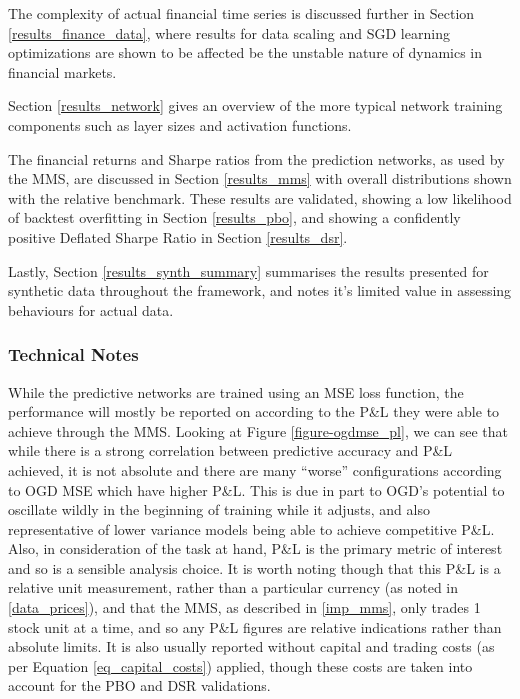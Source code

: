 \documentclass[a4paper,11pt,oneside]{article}
\theoremstyle{plain}
\theoremstyle{definition}
\begin{document}
	The complexity of actual financial time series is discussed further in Section \ref{results_finance_data}, where results for data scaling and SGD learning optimizations are shown to be affected be the unstable nature of dynamics in financial markets.\newline
	
	Section \ref{results_network} gives an overview of the more typical network training components such as layer sizes and activation functions.\newline
	
	The financial returns and Sharpe ratios from the prediction networks, as used by the MMS, are discussed in Section \ref{results_mms} with overall distributions shown with the relative benchmark. These results are validated, showing a low likelihood of backtest overfitting in Section \ref{results_pbo}, and showing a confidently positive Deflated Sharpe Ratio in Section \ref{results_dsr}.  \newline
	
	Lastly, Section \ref{results_synth_summary} summarises the results presented for synthetic data throughout the framework, and notes it's limited value in assessing behaviours for actual data.
	
	\subsubsection{Technical Notes}
	
	While the predictive networks are trained using an MSE loss function, the performance will mostly be reported on according to the P\&L they were able to achieve through the MMS. Looking at Figure \ref{figure-ogdmse_pl}, we can see that while there is a strong correlation between predictive accuracy and P\&L achieved, it is not absolute and there are many ``worse'' configurations according to OGD MSE which have higher P\&L. This is due in part to OGD's potential to oscillate wildly in the beginning of training while it adjusts, and also representative of lower variance models being able to achieve competitive P\&L. Also, in consideration of the task at hand, P\&L is the primary metric of interest and so is a sensible analysis choice. It is worth noting though that this P\&L is a relative unit measurement, rather than a particular currency (as noted in \ref{data_prices}), and that the MMS, as described in \ref{imp_mms}, only trades 1 stock unit at a time, and so any P\&L figures are relative indications rather than absolute limits. It is also usually reported without capital and trading costs (as per Equation \ref{eq_capital_costs}) applied, though these costs are taken into account for the PBO and DSR validations. \newline
\end{document}
